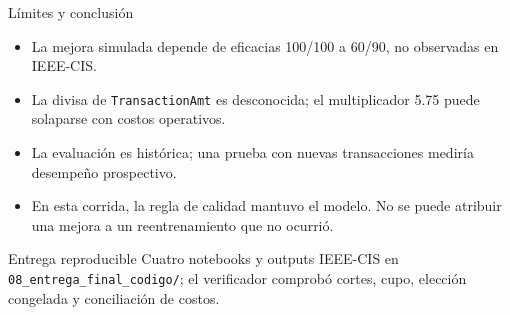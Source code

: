 \documentclass[aspectratio=169,11pt]{beamer}
\begin{document}
\begin{frame}{Límites y conclusión}\small
\begin{itemize}
\item La mejora simulada depende de eficacias 100/100 a 60/90, no observadas en IEEE-CIS.
\item La divisa de \texttt{TransactionAmt} es desconocida; el multiplicador 5.75 puede solaparse con costos operativos.
\item La evaluación es histórica; una prueba con nuevas transacciones mediría desempeño prospectivo.
\item En esta corrida, la regla de calidad mantuvo el modelo. No se puede atribuir una mejora a un reentrenamiento que no ocurrió.
\end{itemize}
\vspace{3mm}
\begin{block}{Entrega reproducible}
Cuatro notebooks y outputs IEEE-CIS en \texttt{08\_entrega\_final\_codigo/}; el verificador comprobó cortes, cupo, elección congelada y conciliación de costos.
\end{block}
\end{frame}
\end{document}
